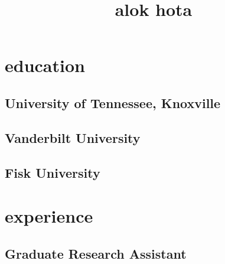 \documentclass{alok_resume}
\begin{document}
\title{alok hota}

\maketitle

\section{education}
\subsection{University of Tennessee, Knoxville}
\subsection{Vanderbilt University}
\subsection{Fisk University}

\section{experience}
\subsection{Graduate Research Assistant}
\end{document}
